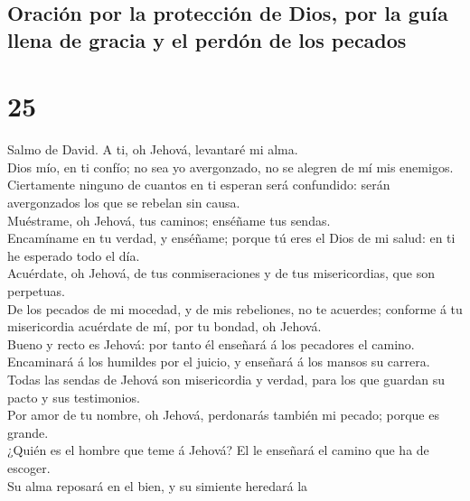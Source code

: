 \hypertarget{oraciuxf3n-por-la-protecciuxf3n-de-dios-por-la-guuxeda-llena-de-gracia-y-el-perduxf3n-de-los-pecados}{%
\subsection{Oración por la protección de Dios, por la guía llena de
gracia y el perdón de los
pecados}\label{oraciuxf3n-por-la-protecciuxf3n-de-dios-por-la-guuxeda-llena-de-gracia-y-el-perduxf3n-de-los-pecados}}

\hypertarget{section-19-25}{%
\section{25}\label{section-19-25}}

 Salmo de David. A ti, oh Jehová, levantaré mi alma.\\
 Dios mío, en ti confío; no sea yo avergonzado, no se
alegren de mí mis enemigos.\\
 Ciertamente ninguno de cuantos en ti esperan será
confundido: serán avergonzados los que se rebelan sin causa.\\
 Muéstrame, oh Jehová, tus caminos; enséñame tus sendas.\\
 Encamíname en tu verdad, y enséñame; porque tú eres el
Dios de mi salud: en ti he esperado todo el día.\\
 Acuérdate, oh Jehová, de tus conmiseraciones y de tus
misericordias, que son perpetuas.\\
 De los pecados de mi mocedad, y de mis rebeliones, no te
acuerdes; conforme á tu misericordia acuérdate de mí, por tu bondad, oh
Jehová.\\
 Bueno y recto es Jehová: por tanto él enseñará á los
pecadores el camino.\\
 Encaminará á los humildes por el juicio, y enseñará á los
mansos su carrera.\\
 Todas las sendas de Jehová son misericordia y verdad,
para los que guardan su pacto y sus testimonios.\\
 Por amor de tu nombre, oh Jehová, perdonarás también mi
pecado; porque es grande.\\
 ¿Quién es el hombre que teme á Jehová? El le enseñará el
camino que ha de escoger.\\
 Su alma reposará en el bien, y su simiente heredará la
